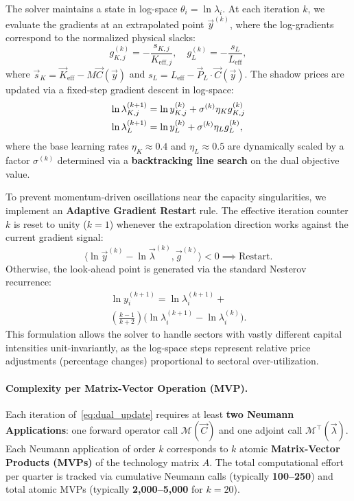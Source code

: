 The solver maintains a state in log-space $\theta_i = \ln \lambda_i$. At each iteration $k$, we evaluate the gradients at an extrapolated point $\vec{y}^{(k)}$, where the log-gradients correspond to the normalized physical slacks:
%
\begin{equation}\label{eq:slacks}
  g_{K,j}^{(k)} = -\frac{s_{K,j}}{K_{\mathrm{eff},j}}, \quad
  g_L^{(k)} = -\frac{s_L}{L_{\mathrm{eff}}},
\end{equation}
%
where $\vec{s}_K = \vec{K}_{\mathrm{eff}} - M\vec{C}(\vec{y})$ and $s_L = L_{\mathrm{eff}} - \vec{P}_{L} \cdot \vec{C}(\vec{y})$.
The shadow prices are updated via a fixed-step gradient descent in log-space:
%
\begin{align}\label{eq:dual_update}
  \ln \lambda_{K,j}^{(k+1)} &= \ln y_{K,j}^{(k)} + \sigma^{(k)} \eta_K g_{K,j}^{(k)} \notag \\
  \ln \lambda_{L}^{(k+1)} &= \ln y_{L}^{(k)} + \sigma^{(k)} \eta_L g_L^{(k)},
\end{align}
%
where the base learning rates $\eta_K \approx 0.4$ and $\eta_L \approx 0.5$ are dynamically scaled by a factor $\sigma^{(k)}$ determined via a \textbf{backtracking line search} on the dual objective value.

To prevent momentum-driven oscillations near the capacity singularities, we implement an \textbf{Adaptive Gradient Restart} rule. The effective iteration counter $k$ is reset to unity ($k = 1$) whenever the extrapolation direction works against the current gradient signal:
%
\begin{equation}
  \langle \ln \vec{y}^{(k)} - \ln \vec{\lambda}^{(k)}, \vec{g}^{(k)} \rangle < 0 \implies \text{Restart}.
\end{equation}
%
Otherwise, the look-ahead point is generated via the standard Nesterov recurrence:
\begin{multline}\label{eq:extrapolation}
  \ln y_{i}^{(k+1)} = \ln \lambda_i^{(k+1)} + \\\left(\frac{k - 1}{k + 2}\right) \bigl(\ln \lambda_i^{(k+1)} - \ln \lambda_i^{(k)}\bigr).
\end{multline}
This formulation allows the solver to handle sectors with vastly different capital intensities unit-invariantly, as the log-space steps represent relative price adjustments (percentage changes) proportional to sectoral over-utilization.


\paragraph{Complexity per Matrix-Vector Operation (MVP).}
Each iteration of~\eqref{eq:dual_update} requires at least \textbf{two Neumann Applications}: one forward operator call $\mathcal{M}(\vec{C})$ and one adjoint call $\mathcal{M}^\top(\vec{\lambda})$. Each Neumann application of order $k$ corresponds to $k$ atomic \textbf{Matrix-Vector Products (MVPs)} of the technology matrix $A$. The total computational effort per quarter is tracked via cumulative Neumann calls (typically \textbf{100--250}) and total atomic MVPs (typically \textbf{2,000--5,000} for $k=20$).

